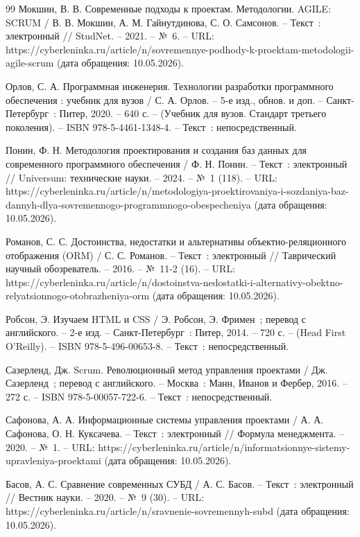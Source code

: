 \begin{thebibliography}{99}
	 Мокшин, В. В. Современные подходы к проектам. Методологии. AGILE: SCRUM / В. В. Мокшин, А. М. Гайнутдинова, С. О. Самсонов. -- Текст~: электронный // StudNet. -- 2021. -- №~6. -- URL: https://cyberleninka.ru/article/n/sovremennye-podhody-k-proektam-metodologii-agile-scrum (дата обращения: 10.05.2026).

	 Орлов, С. А. Программная инженерия. Технологии разработки программного обеспечения : учебник для вузов / С. А. Орлов. -- 5-е изд., обнов. и доп. -- Санкт-Петербург~: Питер, 2020. -- 640 с. -- (Учебник для вузов. Стандарт третьего поколения). -- ISBN 978-5-4461-1348-4. -- Текст~: непосредственный.

	 Понин, Ф. Н. Методология проектирования и создания баз данных для современного программного обеспечения / Ф. Н. Понин. -- Текст~: электронный // Universum: технические науки. -- 2024. -- №~1 (118). -- URL: https://cyberleninka.ru/article/n/metodologiya-proektirovaniya-i-sozdaniya-baz-dannyh-dlya-sovremennogo-programmnogo-obespecheniya (дата обращения: 10.05.2026).

	 Романов, С. С. Достоинства, недостатки и альтернативы объектно-реляционного отображения (ORM) / С. С. Романов. -- Текст~: электронный // Таврический научный обозреватель. -- 2016. -- №~11-2 (16). -- URL: https://cyberleninka.ru/article/n/dostoinstva-nedostatki-i-alternativy-obektno-relyatsionnogo-otobrazheniya-orm (дата обращения: 10.05.2026).

	 Робсон, Э. Изучаем HTML и CSS / Э. Робсон, Э. Фримен~; перевод с английского. -- 2-е изд. -- Санкт-Петербург~: Питер, 2014. -- 720 с. -- (Head First O'Reilly). -- ISBN 978-5-496-00653-8. -- Текст~: непосредственный.

	 Сазерленд, Дж. Scrum. Революционный метод управления проектами / Дж. Сазерленд~; перевод с английского. -- Москва~: Манн, Иванов и Фербер, 2016. -- 272 с. -- ISBN 978-5-00057-722-6. -- Текст~: непосредственный.

	 Сафонова, А. А. Информационные системы управления проектами / А. А. Сафонова, О. Н. Куксачева. -- Текст~: электронный // Формула менеджмента. -- 2020. -- №~1. -- URL: https://cyberleninka.ru/article/n/informatsionnye-sistemy-upravleniya-proektami (дата обращения: 10.05.2026).

	 Басов, А. С. Сравнение современных СУБД / А. С. Басов. -- Текст~: электронный // Вестник науки. -- 2020. -- №~9 (30). -- URL: https://cyberleninka.ru/article/n/sravnenie-sovremennyh-subd (дата обращения: 10.05.2026).


\end{thebibliography}
